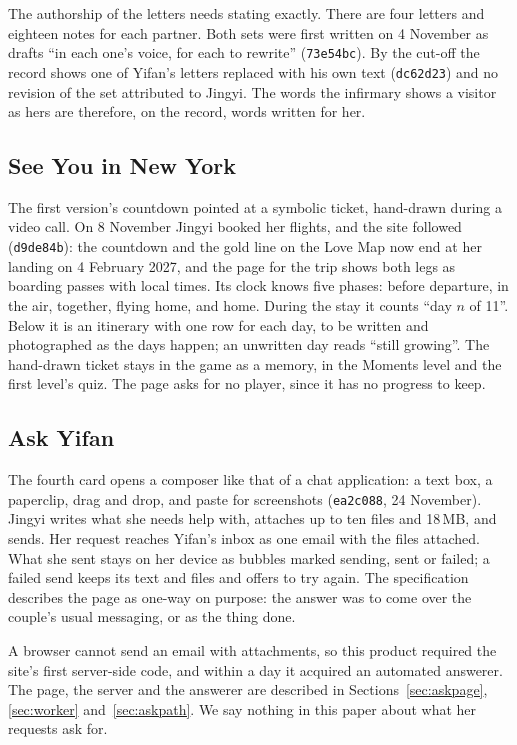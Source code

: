 \documentclass[sigconf,nonacm]{acmart}
\newcommand{\code}[1]{\textnormal{\texttt{\small #1}}}
\begin{document}
The authorship of the letters needs stating exactly. There are four letters and eighteen notes
for each partner. Both sets were first written on 4 November as drafts ``in each one's voice, for
each to rewrite'' (\code{73e54bc}). By the cut-off the record shows one of Yifan's letters
replaced with his own text (\code{dc62d23}) and no revision of the set attributed to Jingyi. The
words the infirmary shows a visitor as hers are therefore, on the record, words written for her.

\subsection{See You in New York}
The first version's countdown pointed at a symbolic ticket, hand-drawn during a video call. On
8 November Jingyi booked her flights, and the site followed (\code{d9de84b}): the countdown and
the gold line on the Love Map now end at her landing on 4 February 2027, and the page for the
trip shows both legs as boarding passes with local times. Its clock knows five phases: before
departure, in the air, together, flying home, and home. During the stay it counts ``day $n$ of
11''. Below it is an itinerary with one row for each day, to be written and photographed as the
days happen; an unwritten day reads ``still growing''. The hand-drawn ticket stays in the game as
a memory, in the Moments level and the first level's quiz. The page asks for no player, since it
has no progress to keep.

\subsection{Ask Yifan}
The fourth card opens a composer like that of a chat application: a text box, a paperclip, drag
and drop, and paste for screenshots (\code{ea2c088}, 24 November). Jingyi writes what she needs
help with, attaches up to ten files and 18\,MB, and sends. Her request reaches Yifan's inbox as
one email with the files attached. What she sent stays on her device as bubbles marked sending,
sent or failed; a failed send keeps its text and files and offers to try again. The specification
describes the page as one-way on purpose: the answer was to come over the couple's usual
messaging, or as the thing done.

A browser cannot send an email with attachments, so this product required the site's first
server-side code, and within a day it acquired an automated answerer. The page, the server and
the answerer are described in Sections~\ref{sec:askpage}, \ref{sec:worker}
and~\ref{sec:askpath}. We say nothing in this paper about what her requests ask for.
\end{document}
